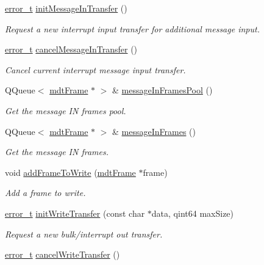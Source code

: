 \begin{DoxyCompactItemize}
\hyperlink{classmdt_abstract_port_ad4121bb930c95887e77f8bafa065a85e}{error\_\-t} \hyperlink{classmdt_usb_port_a897234cc2c7561da323cb124f57bcc28}{initMessageInTransfer} ()
\begin{DoxyCompactList}\small\item\em Request a new interrupt input transfer for additional message input. \end{DoxyCompactList}\item 
\hyperlink{classmdt_abstract_port_ad4121bb930c95887e77f8bafa065a85e}{error\_\-t} \hyperlink{classmdt_usb_port_afddcb02a1e2bd87609fd2b6305534560}{cancelMessageInTransfer} ()
\begin{DoxyCompactList}\small\item\em Cancel current interrupt message input transfer. \end{DoxyCompactList}\item 
QQueue$<$ \hyperlink{classmdt_frame}{mdtFrame} $\ast$ $>$ \& \hyperlink{classmdt_usb_port_a3ad4385983122fcaf6d2560b6bd43acf}{messageInFramesPool} ()
\begin{DoxyCompactList}\small\item\em Get the message IN frames pool. \end{DoxyCompactList}\item 
QQueue$<$ \hyperlink{classmdt_frame}{mdtFrame} $\ast$ $>$ \& \hyperlink{classmdt_usb_port_a3365431076a3197540cbc99278658bda}{messageInFrames} ()
\begin{DoxyCompactList}\small\item\em Get the message IN frames. \end{DoxyCompactList}\item 
void \hyperlink{classmdt_usb_port_a38200f806037e06988e73af246e8a494}{addFrameToWrite} (\hyperlink{classmdt_frame}{mdtFrame} $\ast$frame)
\begin{DoxyCompactList}\small\item\em Add a frame to write. \end{DoxyCompactList}\item 
\hyperlink{classmdt_abstract_port_ad4121bb930c95887e77f8bafa065a85e}{error\_\-t} \hyperlink{classmdt_usb_port_a3340dc3f53e857e39053988e4925fc97}{initWriteTransfer} (const char $\ast$data, qint64 maxSize)
\begin{DoxyCompactList}\small\item\em Request a new bulk/interrupt out transfer. \end{DoxyCompactList}\item 
\hyperlink{classmdt_abstract_port_ad4121bb930c95887e77f8bafa065a85e}{error\_\-t} \hyperlink{classmdt_usb_port_a7cbe1cd3649861aac5e6a14830f06cf9}{cancelWriteTransfer} ()

\end{DoxyCompactItemize}
